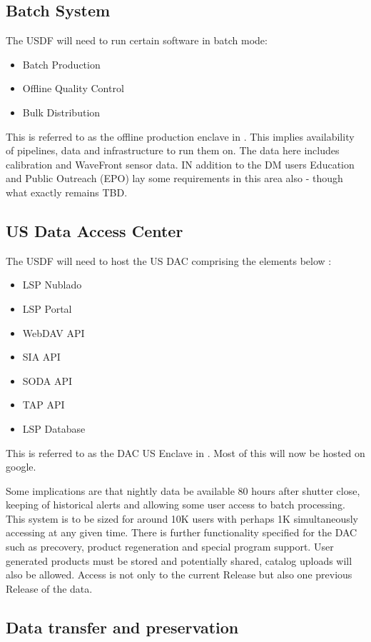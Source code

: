 \subsection{Batch System} \label{sec:offlineprod}

The USDF will need to run certain software in batch mode:
\begin{itemize}
\item Batch Production
\item Offline Quality Control
\item Bulk Distribution
\end{itemize}
This is referred to as the offline production  enclave in \cite{DMTN-104}.
This implies availability of pipelines, data and infrastructure to run them on.
The data here includes calibration and WaveFront sensor data.
IN addition to the DM users Education and Public Outreach (EPO) lay some requirements in this area also - though what exactly remains TBD.


\subsection{US Data Access Center}
The USDF will need to host the US DAC comprising the elements below :
\begin{itemize}
\item LSP Nublado
\item LSP Portal
\item WebDAV API
\item SIA API
\item SODA API
\item TAP API
\item LSP Database
\end{itemize}
This is referred to as the DAC US Enclave in \cite{DMTN-104}.
Most of this will now be hosted on google.

Some implications are that nightly data be available 80 hours after shutter close, keeping of historical alerts and allowing some user access to batch processing.
This system is to be sized for around 10K users with perhaps 1K simultaneously accessing at any given time.
There is further functionality specified for the DAC such as precovery, product regeneration and special program support.
User generated products must be stored and potentially shared, catalog uploads will also be allowed.
Access is not only to the current Release but also one previous Release of the data.

\subsection{Data transfer and preservation} \label{req:dbb}

